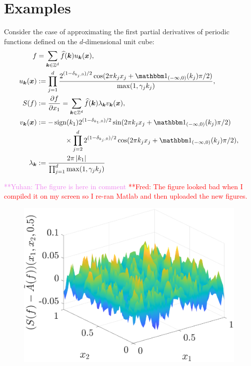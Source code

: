 \documentclass[final]{elsarticle}
\theoremstyle{definition}
\theoremstyle{remark}
\newcommand{\frednote}[1]{  {\textcolor{red}  {\mbox{**Fred:} #1}}}
\newcommand{\yuhannote}[1]{ {\textcolor{violet}  {\mbox{**Yuhan:} #1}}}
\begin{document}
\section{Examples} \label{sec:examp}

Consider the case of approximating the first partial derivatives of periodic functions defined on the $d$-dimensional unit cube:
\begin{align*}
f &= \sum_{\vk \in \integers^d} \hf(\vk) u_{\vk} (\vx), \\
u_{\vk} (\vx) &:= \prod_{j=1}^d \frac{2^{(1-\delta_{k_j,0})/2}\cos(2\pi k_j x_j  + \bbone_{(-\infty,0)}(k_j) \pi/2 )}{\max(1,\gamma_j k_j)},  \\
S(f) &: = \frac{\partial f}{\partial x_1} = \sum_{\vk \in \integers^d} \hf(\vk) \lambda_{\vk} v_{\vk} (\vx), \\
v_{\vk}(\vx) & : =  -\sign(k_1) 2^{(1-\delta_{k_1,0})/2} \sin(2\pi k_j x_j  + \bbone_{(-\infty,0)}(k_j) \pi/2 ) \\
& \qquad \qquad \times \prod_{j=2}^d 2^{(1-\delta_{k_j,0})/2} \cos(2\pi k_j x_j  + \bbone_{(-\infty,0)}(k_j) \pi/2 ), \\
\lambda_{\vk} &:= \frac{2 \pi \abs{k_1}}{\prod_{j=1}^d\max(1,\gamma_j k_j)}
\end{align*}

\yuhannote{The figure is here in comment} \frednote{The figure looked bad when I compiled it on my screen so I re-ran Matlab and then uploaded the new figures.}
\begin{figure}
	\centering
	\includegraphics[width = 8 cm]{ProgramsImages/SimDirectSolErr.eps}
\end{figure}
\end{document}
